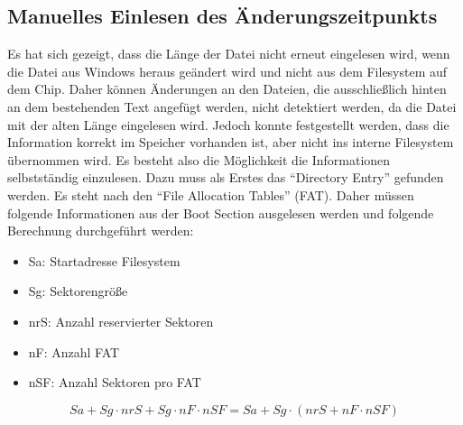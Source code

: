 \subsection{Manuelles Einlesen des Änderungszeitpunkts}
Es hat sich gezeigt, dass die Länge der Datei nicht erneut eingelesen wird, wenn die Datei aus Windows heraus geändert wird und nicht aus dem Filesystem auf dem Chip. Daher können Änderungen an den Dateien, die ausschließlich hinten an dem bestehenden Text angefügt werden, nicht detektiert werden, da die Datei mit der alten Länge eingelesen wird. Jedoch konnte festgestellt werden, dass die Information korrekt im Speicher vorhanden ist, aber nicht ins interne Filesystem übernommen wird. Es besteht also die Möglichkeit die Informationen selbstständig einzulesen. Dazu muss als Erstes das ``Directory Entry'' gefunden werden. Es steht nach den ``File Allocation Tables'' (FAT). Daher müssen folgende Informationen aus der Boot Section ausgelesen werden und folgende Berechnung durchgeführt werden:
\begin{itemize}
    \item Sa: Startadresse Filesystem
    \item Sg: Sektorengröße
    \item nrS: Anzahl reservierter Sektoren
    \item nF: Anzahl FAT
    \item nSF: Anzahl Sektoren pro FAT
\end{itemize}

\[Sa + Sg \cdot nrS + Sg \cdot nF \cdot nSF = Sa + Sg\cdot(nrS + nF \cdot nSF)\]

